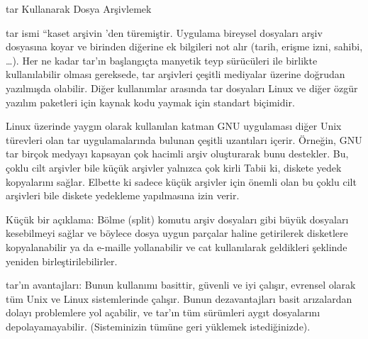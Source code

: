 \begin{section}{tar Kullanarak Dosya Arşivlemek}

tar ismi “kaset arşivin ’den türemiştir. Uygulama bireysel dosyaları arşiv dosyasına koyar ve birinden diğerine ek bilgileri not alır (tarih, erişme izni, sahibi, …). Her ne kadar tar’ın başlangıçta manyetik teyp sürücüleri ile birlikte kullanılabilir olması gereksede, tar arşivleri çeşitli mediyalar üzerine doğrudan yazılmışda olabilir. Diğer kullanımlar arasında tar dosyaları Linux ve diğer özgür yazılım paketleri için kaynak kodu yaymak için standart biçimidir.

Linux üzerinde yaygın olarak kullanılan katman GNU uygulaması diğer Unix türevleri olan tar uygulamalarında bulunan çeşitli uzantıları içerir. Örneğin, GNU tar birçok medyayı kapsayan çok hacimli arşiv oluşturarak bunu destekler. Bu, çoklu cilt arşivler bile küçük arşivler yalnızca çok kirli Tabii ki, diskete yedek kopyalarını sağlar. Elbette ki sadece küçük arşivler için önemli olan bu çoklu cilt arşivleri bile diskete yedekleme yapılmasına izin verir.

Küçük bir açıklama: Bölme (split) komutu arşiv dosyaları gibi büyük dosyaları kesebilmeyi sağlar ve böylece dosya uygun parçalar haline getirilerek disketlere kopyalanabilir ya da e-maille yollanabilir ve cat kullanılarak geldikleri şeklinde yeniden birleştirilebilirler.

tar’ın avantajları: Bunun kullanımı basittir, güvenli ve iyi çalışır, evrensel olarak tüm Unix ve Linux sistemlerinde çalışır. Bunun dezavantajları basit arızalardan dolayı problemlere yol açabilir, ve  tar’ın tüm sürümleri aygıt dosyalarını depolayamayabilir. (Sisteminizin tümüne geri yüklemek istediğinizde).


\end{section}

